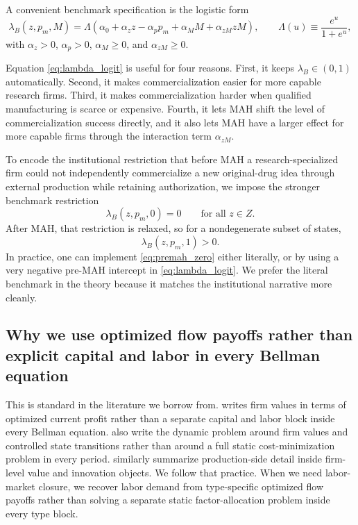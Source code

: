 \documentclass[12pt]{article}
\newcommand{\1}{\mathbf{1}}
\begin{document}
A convenient benchmark specification is the logistic form
\begin{equation}
\lambda_B(z,p_m,M)
=
\Lambda\!\left(\alpha_0+\alpha_z z-\alpha_p p_m+\alpha_M M+\alpha_{zM} zM\right),
\qquad
\Lambda(u)\equiv \frac{e^u}{1+e^u},
\label{eq:lambda_logit}
\end{equation}
with $\alpha_z>0$, $\alpha_p>0$, $\alpha_M\ge 0$, and $\alpha_{zM}\ge 0$.

Equation \eqref{eq:lambda_logit} is useful for four reasons. First, it keeps $\lambda_B\in(0,1)$ automatically. Second, it makes commercialization easier for more capable research firms. Third, it makes commercialization harder when qualified manufacturing is scarce or expensive. Fourth, it lets MAH shift the level of commercialization success directly, and it also lets MAH have a larger effect for more capable firms through the interaction term $\alpha_{zM}$.

To encode the institutional restriction that before MAH a research-specialized firm could not independently commercialize a new original-drug idea through external production while retaining authorization, we impose the stronger benchmark restriction
\begin{equation}
\lambda_B(z,p_m,0)=0
\qquad \text{for all } z\in Z.
\label{eq:premah_zero}
\end{equation}
After MAH, that restriction is relaxed, so for a nondegenerate subset of states,
\begin{equation}
\lambda_B(z,p_m,1)>0.
\label{eq:postmah_positive}
\end{equation}
In practice, one can implement \eqref{eq:premah_zero} either literally, or by using a very negative pre-MAH intercept in \eqref{eq:lambda_logit}. We prefer the literal benchmark in the theory because it matches the institutional narrative more cleanly.

\subsection{Why we use optimized flow payoffs rather than explicit capital and labor in every Bellman equation}

This is standard in the literature we borrow from. \citet{Hopenhayn1992} writes firm values in terms of optimized current profit rather than a separate capital and labor block inside every Bellman equation. \citet{EricsonPakes1995} also write the dynamic problem around firm values and controlled state transitions rather than around a full static cost-minimization problem in every period. \citet{KletteKortum2004} similarly summarize production-side detail inside firm-level value and innovation objects. We follow that practice. When we need labor-market closure, we recover labor demand from type-specific optimized flow payoffs rather than solving a separate static factor-allocation problem inside every type block.
\end{document}

